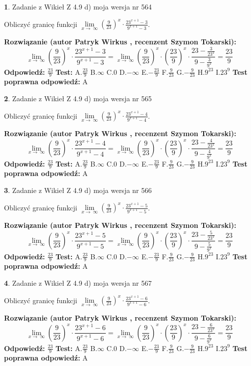 \documentclass[12pt, a4paper]{article}
\theoremstyle{definition} %
\newtheorem{zad}{}
\newcommand{\zadStart}[1]{\begin{zad}#1\newline}
\newcommand{\zadStop}{\end{zad}}
\newcommand{\rozwStart}[2]{\noindent \textbf{Rozwiązanie (autor #1 , recenzent #2): }\newline}
\newcommand{\rozwStop}{\newline}
\newcommand{\odpStart}{\noindent \textbf{Odpowiedź:}\newline}
\newcommand{\odpStop}{\newline}
\newcommand{\testStart}{\noindent \textbf{Test:}\newline}
\newcommand{\testStop}{\newline}
\newcommand{\kluczStart}{\noindent \textbf{Test poprawna odpowiedź:}\newline}
\newcommand{\kluczStop}{\newline}
\begin{document}
\zadStart{Zadanie z Wikieł Z 4.9 d) moja wersja nr 564}


Obliczyć granicę funkcji  $\lim\limits_{x\to\ \infty}(\frac{9}{23})^{x}\cdot\frac{23^{x+1}-3}{9^{x+1}-3}$.
\zadStop
\rozwStart{Patryk Wirkus}{Szymon Tokarski}
$$\lim\limits_{x\to\ \infty}(\frac{9}{23})^{x}\cdot\frac{23^{x+1}-3}{9^{x+1}-3}=\lim\limits_{x\to\ \infty}(\frac{9}{23})^{x}\cdot(\frac{23}{9})^{x} \cdot \frac{23-\frac{3}{23^{x}}}{9-\frac{3}{9^{x}}} = \frac{23}{9}$$
\rozwStop
\odpStart
$\frac{23}{9}$
\odpStop
\testStart
A.$\frac{23}{9}$ B.$\infty$ C.$0$ D.$-\infty$ E.$-\frac{23}{9}$
F.$\frac{9}{23}$ G.$-\frac{9}{23}$
H.$9^{23}$
I.$23^{9}$
\testStop
\kluczStart
A
\kluczStop



\zadStart{Zadanie z Wikieł Z 4.9 d) moja wersja nr 565}


Obliczyć granicę funkcji  $\lim\limits_{x\to\ \infty}(\frac{9}{23})^{x}\cdot\frac{23^{x+1}-4}{9^{x+1}-4}$.
\zadStop
\rozwStart{Patryk Wirkus}{Szymon Tokarski}
$$\lim\limits_{x\to\ \infty}(\frac{9}{23})^{x}\cdot\frac{23^{x+1}-4}{9^{x+1}-4}=\lim\limits_{x\to\ \infty}(\frac{9}{23})^{x}\cdot(\frac{23}{9})^{x} \cdot \frac{23-\frac{4}{23^{x}}}{9-\frac{4}{9^{x}}} = \frac{23}{9}$$
\rozwStop
\odpStart
$\frac{23}{9}$
\odpStop
\testStart
A.$\frac{23}{9}$ B.$\infty$ C.$0$ D.$-\infty$ E.$-\frac{23}{9}$
F.$\frac{9}{23}$ G.$-\frac{9}{23}$
H.$9^{23}$
I.$23^{9}$
\testStop
\kluczStart
A
\kluczStop



\zadStart{Zadanie z Wikieł Z 4.9 d) moja wersja nr 566}


Obliczyć granicę funkcji  $\lim\limits_{x\to\ \infty}(\frac{9}{23})^{x}\cdot\frac{23^{x+1}-5}{9^{x+1}-5}$.
\zadStop
\rozwStart{Patryk Wirkus}{Szymon Tokarski}
$$\lim\limits_{x\to\ \infty}(\frac{9}{23})^{x}\cdot\frac{23^{x+1}-5}{9^{x+1}-5}=\lim\limits_{x\to\ \infty}(\frac{9}{23})^{x}\cdot(\frac{23}{9})^{x} \cdot \frac{23-\frac{5}{23^{x}}}{9-\frac{5}{9^{x}}} = \frac{23}{9}$$
\rozwStop
\odpStart
$\frac{23}{9}$
\odpStop
\testStart
A.$\frac{23}{9}$ B.$\infty$ C.$0$ D.$-\infty$ E.$-\frac{23}{9}$
F.$\frac{9}{23}$ G.$-\frac{9}{23}$
H.$9^{23}$
I.$23^{9}$
\testStop
\kluczStart
A
\kluczStop



\zadStart{Zadanie z Wikieł Z 4.9 d) moja wersja nr 567}


Obliczyć granicę funkcji  $\lim\limits_{x\to\ \infty}(\frac{9}{23})^{x}\cdot\frac{23^{x+1}-6}{9^{x+1}-6}$.
\zadStop
\rozwStart{Patryk Wirkus}{Szymon Tokarski}
$$\lim\limits_{x\to\ \infty}(\frac{9}{23})^{x}\cdot\frac{23^{x+1}-6}{9^{x+1}-6}=\lim\limits_{x\to\ \infty}(\frac{9}{23})^{x}\cdot(\frac{23}{9})^{x} \cdot \frac{23-\frac{6}{23^{x}}}{9-\frac{6}{9^{x}}} = \frac{23}{9}$$
\rozwStop
\odpStart
$\frac{23}{9}$
\odpStop
\testStart
A.$\frac{23}{9}$ B.$\infty$ C.$0$ D.$-\infty$ E.$-\frac{23}{9}$
F.$\frac{9}{23}$ G.$-\frac{9}{23}$
H.$9^{23}$
I.$23^{9}$
\testStop
\kluczStart
A
\kluczStop
\end{document}
